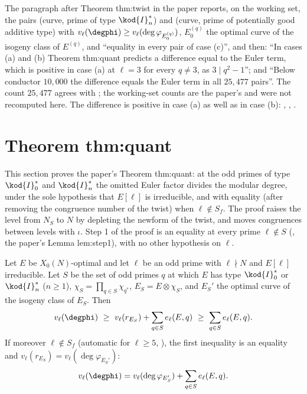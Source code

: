\begin{paperlink}
The paragraph after Theorem thm:twist in the paper reports, on the working set, the pairs (curve, prime of type $\kod{I}_n^*$) and (curve, prime of potentially good additive type) with
$v_\ell(\degphi)\ge v_\ell(\deg\varphi_{E^{(q)}_0})$, $E^{(q)}_0$ the optimal curve of the isogeny class of $E^{(q)}$, and ``equality in every pair of case (c)'', and then: ``In cases (a) and (b) Theorem thm:quant predicts a difference equal to the Euler term, which is
positive in case (a) at $\ell=3$ for every $q\ne3$, as $3\mid q^2-1$''; and ``Below conductor $10{,}000$ the difference equals the Euler term in all $25{,}477$ pairs''. The count $25{,}477$ agrees with
; the working-set counts are the paper's and were not recomputed here. The difference is positive in case (a) as well as in case (b): , , .
\end{paperlink}

\section{Theorem thm:quant}\label{sec:congruence:quant}

This section proves the paper's Theorem thm:quant: at the odd primes of type $\kod{I}_0^*$ and $\kod{I}_n^*$ the omitted Euler factor divides the modular degree, under the sole
hypothesis that $E[\ell]$ is irreducible, and with equality (after removing the congruence number of the twist) when $\ell\notin S_f$. The proof raises the level from $N_S$ to $N$ by
depleting the newform of the twist, and moves congruences between levels with $\iota$. Step 1 of the proof is an equality at every prime $\ell\notin S$
(, the paper's Lemma lem:step1), with no other hypothesis on $\ell$.

\begin{theorem}\label{thm:congruence:quant}
Let $E$ be $X_0(N)$-optimal and let $\ell$ be an odd prime with $\ell\nmid N$ and $E[\ell]$ irreducible. Let $S$ be the set of odd primes $q$ at which $E$ has type $\kod{I}_0^*$ or $\kod{I}_n^*$ ($n\ge1$), $\chi_S=\prod_{q\in S}\chi_{q^*}$,
$E_S=E\otimes\chi_S$, and $E_S'$ the optimal curve of the isogeny class of $E_S$. Then
\begin{equation}\label{eq:congruence:quant}
v_\ell(\degphi)\ \ge\ v_\ell(r_{E_S})+\sum_{q\in S}e_\ell(E,q)\ \ge\ \sum_{q\in S}e_\ell(E,q).
\end{equation}
If moreover $\ell\notin S_f$ (automatic for $\ell\ge5$, ), the first inequality is an equality and $v_\ell(r_{E_S})=v_\ell(\deg\varphi_{E_S'})$:
\[
v_\ell(\degphi)=v_\ell(\deg\varphi_{E_S'})+\sum_{q\in S}e_\ell(E,q).
\]
\end{theorem}

